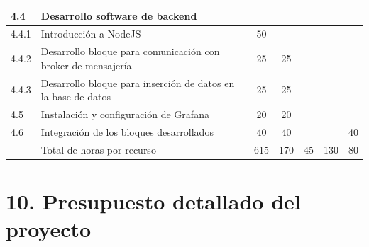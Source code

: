 \documentclass[11pt]{charter}
\begin{document}
\begin{table}[ht]
{\begin{tabular}{|l|l|c|c|c|c|c|}
4.4   & Desarrollo software de backend                                       & \multicolumn{5}{c|}{}                         \\ \hline
4.4.1 & Introducción a NodeJS                                                & 50      &         &         &        &        \\ \hline
4.4.2 & Desarrollo bloque para comunicación con broker de mensajería         & 25      & 25      &         &        &        \\ \hline
4.4.3 & Desarrollo bloque para inserción de datos en la base de datos        & 25      & 25      &         &        &        \\ \hline
4.5   & Instalación y configuración de Grafana                               & 20      & 20      &         &        &        \\ \hline
4.6   & Integración de los bloques desarrollados                             & 40      & 40      &         &        & 40     \\ \hline
\rowcolor[HTML]{9B9B9B} 
 &
  Total de horas por recurso &
  \multicolumn{1}{c|}{\cellcolor[HTML]{9B9B9B}615} &
  \multicolumn{1}{c|}{\cellcolor[HTML]{9B9B9B}170} &
  \multicolumn{1}{c|}{\cellcolor[HTML]{9B9B9B}45} &
  \multicolumn{1}{c|}{\cellcolor[HTML]{9B9B9B}130} &
  \multicolumn{1}{c|}{\cellcolor[HTML]{9B9B9B}80} \\ \hline
\end{tabular}%
}
\end{table}


\section{10. Presupuesto detallado del proyecto}
\label{sec:presupuesto}
\end{document}
